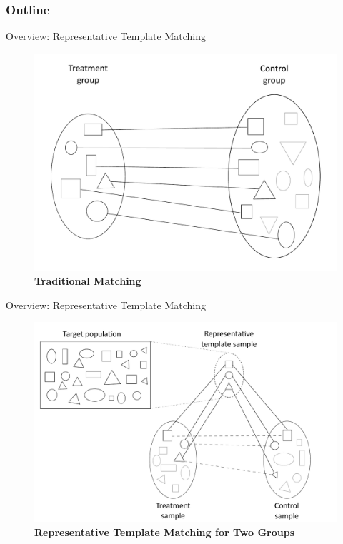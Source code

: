 \documentclass[usenames,dvipsnames,11pt,aspectratio=169]{beamer}
\begin{document}
\begin{frame}
\frametitle{Outline}
\end{frame}

\begin{frame}{Overview: Representative Template Matching}
\begin{figure}[!htb]
\centering
\caption*{\textbf{Traditional Matching}}
   \includegraphics[height=0.8\textheight]{figures/diagram1_v2.pdf}
\end{figure}
\end{frame}

\begin{frame}{Overview: Representative Template Matching}
\begin{figure}[!htb]
\centering
\caption*{\textbf{Representative Template Matching for Two Groups}}
   \includegraphics[height=0.8\textheight]{figures/diagram2_v3.pdf}
\end{figure}
\end{frame}
\end{document}
